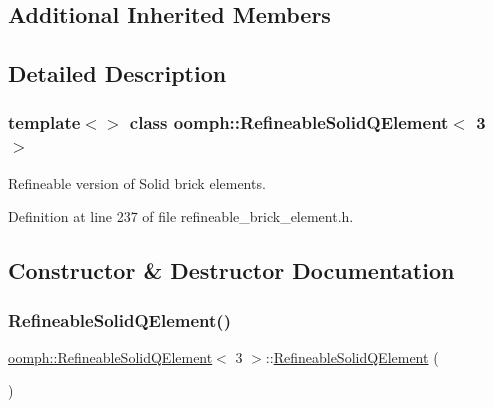 \subsection*{Additional Inherited Members}


\subsection{Detailed Description}
\subsubsection*{template$<$$>$\newline
class oomph\+::\+Refineable\+Solid\+Q\+Element$<$ 3 $>$}

Refineable version of Solid brick elements. 

Definition at line 237 of file refineable\+\_\+brick\+\_\+element.\+h.



\subsection{Constructor \& Destructor Documentation}
\mbox{\label{classoomph_1_1RefineableSolidQElement_3_013_01_4_a2ed2ea0f307ab12940b058734a428eea}} 
\subsubsection{\texorpdfstring{Refineable\+Solid\+Q\+Element()}{RefineableSolidQElement()}\hspace{0.1cm}{\footnotesize\ttfamily [1/2]}}
{\footnotesize\ttfamily \hyperlink{classoomph_1_1RefineableSolidQElement}{oomph\+::\+Refineable\+Solid\+Q\+Element}$<$ 3 $>$\+::\hyperlink{classoomph_1_1RefineableSolidQElement}{Refineable\+Solid\+Q\+Element} (\begin{DoxyParamCaption}{ }\end{DoxyParamCaption})\hspace{0.3cm}{\ttfamily [inline]}}



